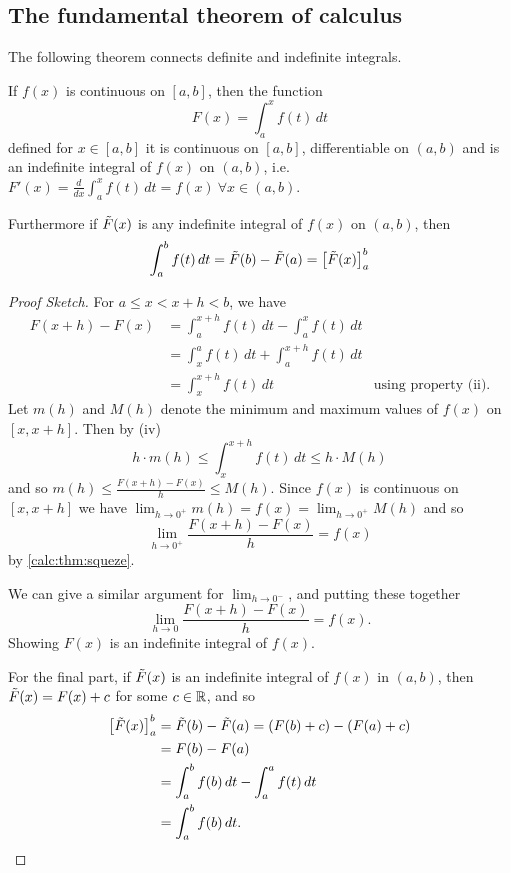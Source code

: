 \documentclass[10pt, a4paper]{article}
\begin{document}
\subsection{The fundamental theorem of calculus}
The following theorem connects definite and indefinite integrals.
\begin{theorem}
    If $f(x)$ is continuous on $[a, b]$,
    then the function
    \[
    F(x) = \int_a^xf(t)\,dt
    \]
    defined for $x \in [a, b]$ it is continuous on $[a, b]$,
    differentiable on $(a, b)$ and is an indefinite integral of $f(x)$ on $(a, b)$,
    i.e. $F'(x) = \frac{d}{dx}\int_a^xf(t)\,dt = f(x)\ \forall x \in (a, b)$.

    Furthermore if $\Tilde{F}(x)$ is any indefinite integral of $f(x)$ on $(a, b)$,
    then
    \[
    \int_a^bf(t)\,dt = \Tilde{F}(b) - \Tilde{F}(a) = \left[\Tilde{F}(x)\right]^b_a
    \]
    \begin{proof}[Proof Sketch]\renewcommand{\qedsymbol}{$\triangle$}
        For $a \leq x < x + h < b$,
        we have
        \begin{align*}
            F(x + h) - F(x) &= \int_a^{x + h}f(t)\,dt - \int_a^xf(t)\,dt \\
            &= \int_x^af(t)\,dt + \int_a^{x + h}f(t)\,dt \\
            &= \int_x^{x + h}f(t)\,dt&\text{using property (ii)}.
        \end{align*}
        Let $m(h)$ and $M(h)$ denote the minimum and maximum values of $f(x)$ on $[x, x + h]$.
        Then by (iv)
        \[
        h \cdot m(h) \leq \int_x^{x + h}f(t)\,dt \leq h \cdot M(h)
        \]
        and so $m(h) \leq \frac{F(x + h) - F(x)}{h} \leq M(h)$.
        Since $f(x)$ is continuous on $[x, x + h]$ we have $\displaystyle\lim_{h \rightarrow 0 ^ +}m(h) = f(x) = \lim_{h \rightarrow 0 ^ +}M(h)$
        and so
        \[
        \lim_{h \rightarrow 0 ^ +}\frac{F(x + h) - F(x)}{h} = f(x)
        \]
        by \autoref{calc:thm:squeze}.

        We can give a similar argument for $\lim_{h \rightarrow 0 ^ -}$,
        and putting these together
        \[
        \lim_{h \rightarrow 0}\frac{F(x + h) - F(x)}{h} = f(x).
        \]
        Showing $F(x)$ is an indefinite integral of $f(x)$.

        For the final part,
        if $\Tilde{F}(x)$ is an indefinite integral of $f(x)$ in $(a, b)$,
        then $\Tilde{F}(x) = F(x) + c$ for some $c \in \mathbb{R}$,
        and so
        \begin{align*}
        \left[\Tilde{F}(x)\right]_a^b &= \Tilde{F}(b) - \Tilde{F}(a) = (F(b) + c) - (F(a) + c) \\
        &= F(b) - F(a) \\
        &= \int_a^bf(b)\,dt - \int_a^af(t)\,dt \\
        &= \int_a^bf(b)\,dt.
        \end{align*}
    \end{proof}
\end{theorem}
\end{document}
